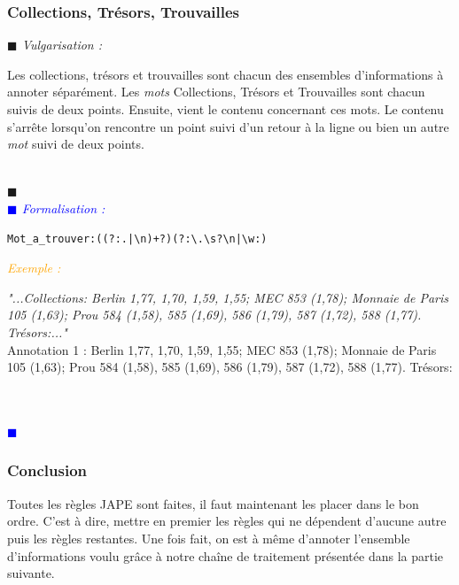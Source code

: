 \documentclass[a4paper, 11pt]{report}
\newenvironment{vulgarisation}
    {
    \textit{\textcolor{dark-blue}{$\blacksquare$  Vulgarisation : \\}}

    }
    {
    ~\\\textcolor{dark-blue}{$\blacksquare$}\\
    }
\newenvironment{formalisation}
    {
    \textit{\textcolor{blue}{$\blacksquare$  Formalisation : \\}}
    }
    {
    ~\\\textcolor{blue}{$\blacksquare$}\\
    }
\newenvironment{exemple}
    {
    \textit{\textcolor{orange}{
    Exemple : \\}}
    }
    {~\\
    }
\begin{document}
\subsubsection{Collections, Trésors, Trouvailles}
\begin{vulgarisation}
Les collections, trésors et trouvailles sont chacun des ensembles d'informations à annoter séparément.
    Les \textit{mots} Collections, Trésors et Trouvailles sont chacun suivis de deux points. Ensuite, vient le contenu concernant ces mots. Le contenu s'arrête lorsqu'on rencontre un point suivi d'un retour à la ligne ou bien un autre \textit{mot} suivi de deux points.
\end{vulgarisation}
\begin{formalisation}
    \begin{verbatim}
Mot_a_trouver:((?:.|\n)+?)(?:\.\s?\n|\w:)
    \end{verbatim}
    \begin{exemple}
        \emph{"...Collections: Berlin 1,77, 1,70, 1,59,
            1,55; MEC 853 (1,78); Monnaie de Paris 105 (1,63); Prou 584 (1,58), 585 (1,69), 586 (1,79), 587 
            (1,72), 588 (1,77). Trésors:..."}\\
        Annotation 1 :  Berlin 1,77, 1,70, 1,59,
        1,55; MEC 853 (1,78); Monnaie de Paris 105 (1,63); Prou 584 (1,58), 585 (1,69), 586 (1,79), 587 (1,72), 588 (1,77). Trésors:
    \end{exemple}
\end{formalisation}

\subsubsection*{Conclusion}
Toutes les règles JAPE sont faites, il faut maintenant les placer dans le bon ordre. C'est à dire, mettre en premier les règles qui ne dépendent d'aucune autre puis les règles restantes. Une fois fait, on est à même d'annoter l'ensemble d'informations voulu grâce à notre chaîne de traitement présentée dans la partie suivante.
\end{document}

